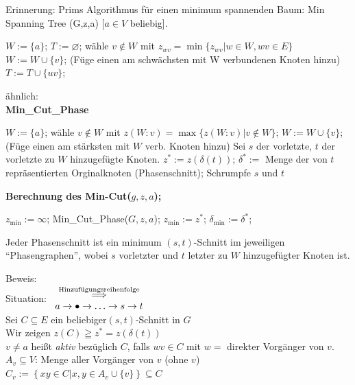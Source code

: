 Erinnerung: Prims Algorithmus für einen minimum spannenden Baum: Min
Spanning Tree (G,z,a) [$a\in V$ beliebig].

\begin{algorithmic}
\STATE $W := \{a\}$;
\STATE $T := \varnothing$;
\STATE wähle $v \not\in W$ mit $z_{w v} = \min \{z_{w v} | w \in W, w v \in
E\}$
\STATE $W := W \cup \{v\}$; \hspace{3mm} (Füge einen am schwächsten mit W
verbundenen Knoten hinzu)
\STATE $T := T \cup \{u v\}$;
\ENDWHILE
\end{algorithmic}
ähnlich:\\
{\bf Min\_Cut\_Phase}
\begin{algorithmic}
\STATE $W:= \{a\}$;
\STATE wähle $v\not\in W $ mit $z(W:v) = \max\{z(W:v)|v \not\in W\}$;
\STATE $W:= W \cup \{v\}$; \hspace{3mm}(Füge einen am stärksten mit $W$ 
verb. Knoten hinzu)
\ENDWHILE
\STATE Sei $s$ der vorletzte, $t$ der vorletzte zu $W$ hinzugefügte Knoten.
\STATE $z^{\ast} := z(\delta(t))$;
\STATE $\delta^{\ast} :=$ Menge der von $t$ repräsentierten Orginalknoten
(Phasenschnitt);
\STATE Schrumpfe $s$ und $t$
\end{algorithmic}

{\bf Berechnung des Min-Cut($g,z,a$);}
\begin{algorithmic}
\STATE $z_{\min} := \infty$;
\STATE Min\_Cut\_Phase($G,z,a$);
\STATE $z_{\min} := z^{\ast}$;
\STATE $\delta_{\min} := \delta^{\ast}$;
\ENDIF
\ENDWHILE
\end{algorithmic}

\begin{lemma}
Jeder Phasenschnitt ist ein minimum $(s,t)$-Schnitt im jeweiligen
"`Phasengraphen"', wobei $s$ vorletzter und $t$ letzter zu $W$
hinzugefügter Knoten ist.
\end{lemma}

Beweis:\\
Situation: $\begin{array}{c}\stackrel{\mbox{\scriptsize
Hinzufügungsreihenfolge}}{\Longrightarrow}\\a \rightarrow \bullet \rightarrow 
\ldots \rightarrow s \rightarrow t\end{array}$\\
Sei $C \subseteq E$ ein beliebiger$(s,t)$-Schnitt in $G$\\
Wir zeigen $z(C) \geqq z^{\ast}=z(\delta(t))$\\
$v\neq a$ heißt {\it aktiv} bezüglich $C$, falls $w v \in C$ mit
$w=$ direkter Vorgänger von $v$.\\
$A_{v} \subseteq V$: Menge aller Vorgänger von $v$ (ohne $v$)\\
$C_{v} := \left\{x y \in C | x,y \in A_{v} \cup \{v\}\right\} \subseteq C$

